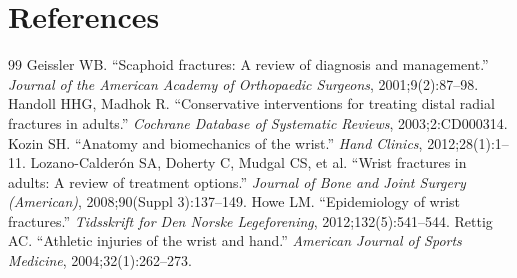 \section*{References}
\begin{thebibliography}{99}
 Geissler WB. ``Scaphoid fractures: A review of diagnosis and management.'' \textit{Journal of the American Academy of Orthopaedic Surgeons}, 2001;9(2):87--98.
 Handoll HHG, Madhok R. ``Conservative interventions for treating distal radial fractures in adults.'' \textit{Cochrane Database of Systematic Reviews}, 2003;2:CD000314.
 Kozin SH. ``Anatomy and biomechanics of the wrist.'' \textit{Hand Clinics}, 2012;28(1):1--11.
 Lozano-Calder\'{o}n SA, Doherty C, Mudgal CS, et al. ``Wrist fractures in adults: A review of treatment options.'' \textit{Journal of Bone and Joint Surgery (American)}, 2008;90(Suppl 3):137--149.
 Howe LM. ``Epidemiology of wrist fractures.'' \textit{Tidsskrift for Den Norske Legeforening}, 2012;132(5):541--544.
 Rettig AC. ``Athletic injuries of the wrist and hand.'' \textit{American Journal of Sports Medicine}, 2004;32(1):262--273.
\end{thebibliography}
